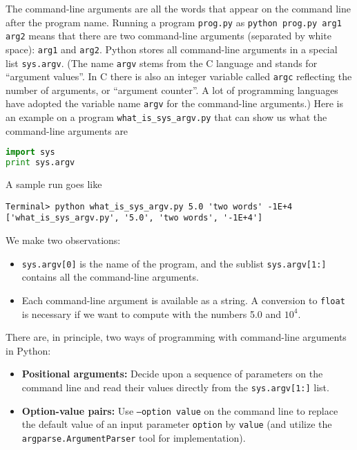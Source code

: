 \documentclass[graybox,sectrefs,envcountresetchap,open=right,final]{svmonodo}
\begin{document}
The command-line arguments are all the words that appear on the
command line after the program name. Running a program \texttt{prog.py}
as \texttt{python prog.py arg1 arg2} means that there are two command-line arguments
(separated by white space): \texttt{arg1} and \texttt{arg2}.
Python stores all command-line arguments in
a special list \texttt{sys.argv}. (The name \texttt{argv} stems from the C language and
stands for ``argument values''. In C there is also an integer variable
called \texttt{argc} reflecting the number of arguments, or ``argument counter''.
A lot of programming languages have adopted the variable name \texttt{argv} for
the command-line arguments.)
Here is an example on a
program \Verb!what_is_sys_argv.py! that can show us what the command-line arguments
are

\begin{lstlisting}[language=Python,style=blue1bar_bluegreen]
import sys
print sys.argv
\end{lstlisting}
A sample run goes like

\begin{Verbatim}[frame=lines,label=\fbox{{\tiny Terminal}},framesep=2.5mm,framerule=0.7pt,fontsize=\fontsize{9pt}{9pt}]
Terminal> python what_is_sys_argv.py 5.0 'two words' -1E+4
['what_is_sys_argv.py', '5.0', 'two words', '-1E+4']
\end{Verbatim}
We make two observations:

\begin{itemize}
 \item \texttt{sys.argv[0]} is the name of the program,
   and the sublist \texttt{sys.argv[1:]} contains all the command-line arguments.

 \item Each command-line argument is available as a string. A conversion to
   \texttt{float} is necessary if we want to compute with the numbers 5.0 and
   $10^4$.
\end{itemize}

\noindent
There are, in principle, two ways of programming with
command-line arguments in Python:

\begin{itemize}
 \item \textbf{Positional arguments:} Decide upon a sequence of parameters
   on the command line and read
   their values directly from the \texttt{sys.argv[1:]} list.

 \item \textbf{Option-value pairs:}  Use \texttt{--option value} on
   the command line to replace the default value of an input parameter
   \texttt{option} by \texttt{value} (and utilize the \texttt{argparse.ArgumentParser} tool
   for implementation).
\end{itemize}
\end{document}
